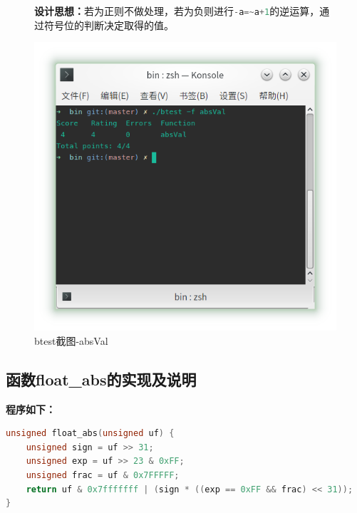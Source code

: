 \begin{figure}[H]
\begin{minipage}[c]{0.5\linewidth}
\textbf{设计思想：}若为正则不做处理，若为负则进行\lstinline[language=c]|-a=~a+1|的逆运算，通过符号位的判断决定取得的值。
\end{minipage}
\begin{minipage}[c]{0.4\linewidth}
\centering
\includegraphics[width=0.9\linewidth]{figures/absVal}
\caption{btest截图-absVal}
\label{fig:absVal}
\end{minipage}
\end{figure}

\subsection{函数float\_abs的实现及说明}
\textbf{程序如下：}

\begin{lstlisting}[language = c]
unsigned float_abs(unsigned uf) {
	unsigned sign = uf >> 31;
	unsigned exp = uf >> 23 & 0xFF;
	unsigned frac = uf & 0x7FFFFF;
	return uf & 0x7fffffff | (sign * ((exp == 0xFF && frac) << 31));
}
\end{lstlisting}

